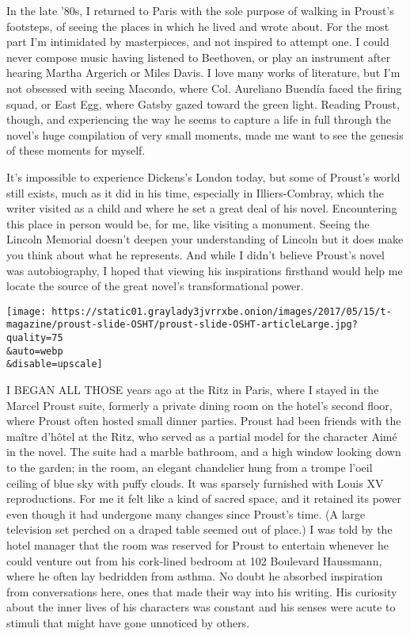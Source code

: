 In the late '80s, I returned to Paris with the sole purpose of walking
in Proust's footsteps, of seeing the places in which he lived and wrote
about. For the most part I'm intimidated by masterpieces, and not
inspired to attempt one. I could never compose music having listened to
Beethoven, or play an instrument after hearing Martha Argerich or Miles
Davis. I love many works of literature, but I'm not obsessed with seeing
Macondo, where Col. Aureliano Buendía faced the firing squad, or East
Egg, where Gatsby gazed toward the green light. Reading Proust, though,
and experiencing the way he seems to capture a life in full through the
novel's huge compilation of very small moments, made me want to see the
genesis of these moments for myself.

It's impossible to experience Dickens's London today, but some of
Proust's world still exists, much as it did in his time, especially in
Illiers-Combray, which the writer visited as a child and where he set a
great deal of his novel. Encountering this place in person would be, for
me, like visiting a monument. Seeing the Lincoln Memorial doesn't deepen
your understanding of Lincoln but it does make you think about what he
represents. And while I didn't believe Proust's novel was autobiography,
I hoped that viewing his inspirations firsthand would help me locate the
source of the great novel's transformational power.

\texttt{[image: https://static01.graylady3jvrrxbe.onion/images/2017/05/15/t-magazine/proust-slide-OSHT/proust-slide-OSHT-articleLarge.jpg?quality=75\\\&auto=webp\\\&disable=upscale]}

I BEGAN ALL THOSE years ago at the Ritz in Paris, where I stayed in the
Marcel Proust suite, formerly a private dining room on the hotel's
second floor, where Proust often hosted small dinner parties. Proust had
been friends with the maître d'hôtel at the Ritz, who served as a
partial model for the character Aimé in the novel. The suite had a
marble bathroom, and a high window looking down to the garden; in the
room, an elegant chandelier hung from a trompe l'oeil ceiling of blue
sky with puffy clouds. It was sparsely furnished with Louis XV
reproductions. For me it felt like a kind of sacred space, and it
retained its power even though it had undergone many changes since
Proust's time. (A large television set perched on a draped table seemed
out of place.) I was told by the hotel manager that the room was
reserved for Proust to entertain whenever he could venture out from his
cork-lined bedroom at 102 Boulevard Haussmann, where he often lay
bedridden from asthma. No doubt he absorbed inspiration from
conversations here, ones that made their way into his writing. His
curiosity about the inner lives of his characters was constant and his
senses were acute to stimuli that might have gone unnoticed by others.


